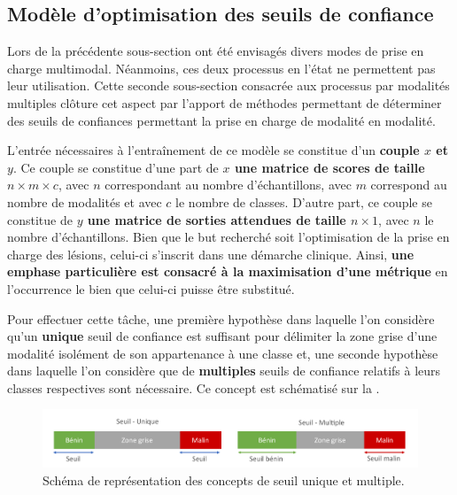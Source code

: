 \subsection{Modèle d'optimisation des seuils de confiance}
\label{sec:multimodal_confidence_model}
Lors de la précédente sous-section ont été envisagés divers modes de prise en charge multimodal. Néanmoins, ces deux processus en l'état ne permettent pas leur utilisation. Cette seconde sous-section consacrée aux processus par modalités multiples clôture cet aspect par l'apport de méthodes permettant de déterminer des seuils de confiances permettant la prise en charge de modalité en modalité.\par

L'entrée nécessaires à l'entraînement de ce modèle se constitue d'un \textbf{couple $x$ et $y$}. Ce couple se constitue d'une part de \textbf{$x$ une matrice de scores de taille $n \times m \times c$}, avec $n$ correspondant au nombre d'échantillons, avec $m$ correspond au nombre de modalités et avec $c$ le nombre de classes. D'autre part, ce couple se constitue de \textbf{$y$ une matrice de sorties attendues de taille $n \times 1$}, avec $n$ le nombre d'échantillons. Bien que le but recherché soit l'optimisation de la prise en charge des lésions, celui-ci s'inscrit dans une démarche clinique. Ainsi, \textbf{une emphase particulière est consacré à la maximisation d'une métrique} en l'occurrence le \fscore{} bien que celui-ci puisse être substitué.\par

Pour effectuer cette tâche, une première hypothèse dans laquelle l'on considère qu'un \textbf{unique} seuil de confiance est suffisant pour délimiter la zone grise d'une modalité isolément de son appartenance à une classe et, une seconde hypothèse dans laquelle l'on considère que de \textbf{multiples} seuils de confiance relatifs à leurs classes respectives sont nécessaire. Ce concept est schématisé sur la .\par

\begin{figure}[H]
    \centering
    \includegraphics[width=\linewidth]{contents/chapter_8/resources/scheme_multimodal_treshold.pdf}
    \caption{Schéma de représentation des concepts de seuil unique et multiple.}
    \label{fig:scheme_multimodal_treshold}
\end{figure}\par

